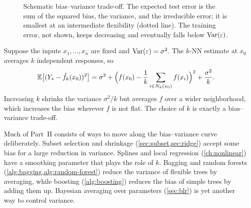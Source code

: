 \begin{figure}[ht]
\centering
{}
\caption{Schematic bias--variance trade-off. The expected test error is the sum of the squared bias, the variance, and the irreducible error; it is smallest at an intermediate flexibility (dotted line). The training error, not shown, keeps decreasing and eventually falls below $\operatorname{Var}(\varepsilon)$.}
\label{fig:bias-variance}
\end{figure}

\begin{remark}\label{rem:knn-bias-variance}
Suppose the inputs $x_1,\dots,x_n$ are fixed and $\operatorname{Var}(\varepsilon)=\sigma^2$. The $k$-NN estimate at $x_0$ averages $k$ independent responses, so
\[
\mathbb{E}\big[(Y_*-\hat f_k(x_0))^2\big]=\sigma^2+\Big(f(x_0)-\frac1k\sum_{i\in N_k(x_0)}f(x_i)\Big)^2+\frac{\sigma^2}{k}.
\]
Increasing $k$ shrinks the variance $\sigma^2/k$ but averages $f$ over a wider neighborhood, which increases the bias wherever $f$ is not flat. The choice of $k$ is exactly a bias--variance trade-off.
\end{remark}

\begin{remark}
Much of Part~II consists of ways to move along the bias--variance curve deliberately. Subset selection and shrinkage (\cref{sec:subset,sec:ridge}) accept some bias for a large reduction in variance. Splines and local regression (\cref{ch:nonlinear}) have a smoothing parameter that plays the role of $k$. Bagging and random forests (\cref{alg:bagging,alg:random-forest}) reduce the variance of flexible trees by averaging, while boosting (\cref{alg:boosting}) reduces the bias of simple trees by adding them up. Bayesian averaging over parameters (\cref{sec:blr}) is yet another way to control variance.
\end{remark}

